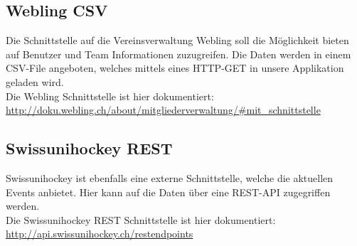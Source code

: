 		\subsection{Webling CSV}
		Die Schnittstelle auf die Vereinsverwaltung Webling soll die Möglichkeit bieten auf Benutzer und Team Informationen zuzugreifen. Die Daten werden in einem CSV-File angeboten, welches mittels eines HTTP-GET in unsere Applikation geladen wird.
		\\Die Webling Schnittstelle ist hier dokumentiert: 
		\\\url{http://doku.webling.ch/about/mitgliederverwaltung/#mit_schnittstelle}

		\subsection{Swissunihockey REST}
		Swissunihockey ist ebenfalls eine externe Schnittstelle, welche die aktuellen Events anbietet. Hier kann auf die Daten über eine REST-API zugegriffen werden.
		\\Die Swissunihockey REST Schnittstelle ist hier dokumentiert: 
		\\\url{http://api.swissunihockey.ch/restendpoints}